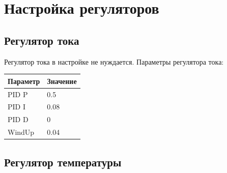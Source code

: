 \section{Настройка регуляторов}

\subsection{Регулятор тока}

Регулятор тока в настройке не нуждается. Параметры регулятора тока:

\begin{tabular}{|l|l|}
    \hline
    Параметр & Значение \\ \hline
    PID P & 0.5 \\ \hline
    PID I & 0.08 \\ \hline
    PID D & 0 \\ \hline
    WindUp & 0.04 \\ \hline
\end{tabular}

\subsection{Регулятор температуры}


